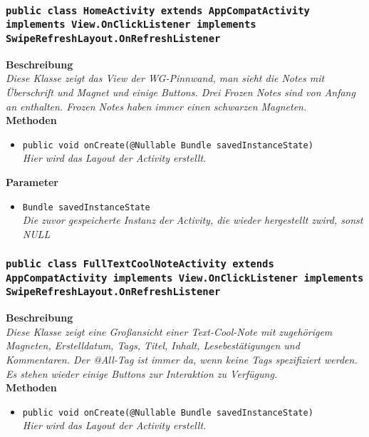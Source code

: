 \subsubsection{\texttt{public class HomeActivity extends AppCompatActivity implements View.OnClickListener implements SwipeRefreshLayout.OnRefreshListener}}

	\textbf{Beschreibung} \\
	\textit{Diese Klasse zeigt das View der WG-Pinnwand, man sieht die Notes mit Überschrift und Magnet und einige Buttons. Drei Frozen Notes sind von Anfang an enthalten. Frozen Notes haben immer einen schwarzen Magneten.} \\

	\textbf{Methoden}
	\begin{itemize}
		\item\texttt{{public void onCreate(@Nullable Bundle savedInstanceState)}}\\
	\textit{Hier wird das Layout der Activity erstellt.}\\
	\end{itemize}

	\textbf{Parameter}
	\begin{itemize}
		\item\texttt{Bundle savedInstanceState}\\  
	\textit{Die zuvor gespeicherte Instanz der Activity, die wieder hergestellt zwird, sonst NULL}\\
	\end{itemize} 

\subsubsection{\texttt{public class FullTextCoolNoteActivity extends AppCompatActivity implements View.OnClickListener implements SwipeRefreshLayout.OnRefreshListener}}

	\textbf{Beschreibung} \\
	\textit{Diese Klasse zeigt eine Großansicht einer Text-Cool-Note mit zugehörigem Magneten, Erstelldatum, Tags, Titel, Inhalt, Lesebestätigungen und Kommentaren. Der @All-Tag ist immer da, wenn keine Tags spezifiziert werden. Es stehen wieder einige Buttons zur Interaktion zu Verfügung.} \\

	\textbf{Methoden}
	\begin{itemize}
		\item\texttt{{public void onCreate(@Nullable Bundle savedInstanceState)}}\\
	\textit{Hier wird das Layout der Activity erstellt.}\\
	\end{itemize}


